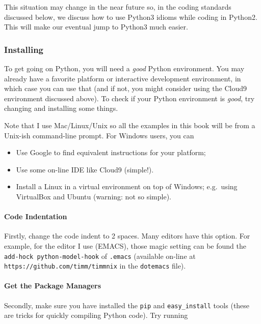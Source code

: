 This situation may change in the near future so, in the coding standards
discussed below, we discuss how to use Python3 idioms while coding in
Python2. This will make our eventual jump to Python3 much easier.

\subsubsection{Installing}\label{installing}

To get going on Python, you will need a \emph{good} Python environment.
You may already have a favorite platform or interactive development
environment, in which case you can use that (and if not, you might
consider using the Cloud9 environment discussed above). To check if your
Python environment is \emph{good}, try changing and installing some
things.

Note that I use Mac/Linux/Unix so all the examples in this book will be
from a Unix-ish command-line prompt. For Windows users, you can

\begin{itemize}
\itemsep1pt\parskip0pt
\item
  Use Google to find equivalent instructions for your platform;
\item
  Use some on-line IDE like Cloud9 (simple!).
\item
  Install a Linux in a virtual environment on top of Windows; e.g.~using
  VirtualBox and Ubuntu (warning: not so simple).
\end{itemize}

\paragraph{Code Indentation}\label{code-indentation}

Firstly, change the code indent to 2 spaces. Many editors have this
option. For example, for the editor I use (EMACS), those magic setting
can be found the \texttt{add-hock\ \textquotesingle{}python-model-hook}
of \texttt{.emacs} (available on-line at
\texttt{https://github.com/timm/timmnix} in the \texttt{dotemacs} file).

\paragraph{Get the Package Managers}\label{get-the-package-managers}

Secondly, make sure you have installed the \texttt{pip} and
\texttt{easy\_install} tools (these are tricks for quickly compiling
Python code). Try running

